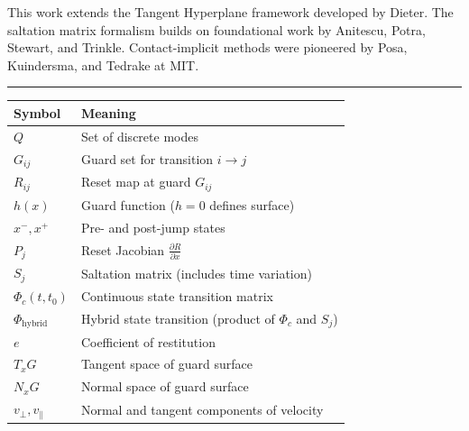 \documentclass[
  letterpaper,
  DIV=11,
  numbers=noendperiod]{scrartcl}
\begin{document}
This work extends the Tangent Hyperplane framework developed by Dieter.
The saltation matrix formalism builds on foundational work by Anitescu,
Potra, Stewart, and Trinkle. Contact-implicit methods were pioneered by
Posa, Kuindersma, and Tedrake at MIT.

\begin{center}\rule{0.5\linewidth}{0.5pt}\end{center}

\begin{tcolorbox}[enhanced jigsaw, coltitle=black, titlerule=0mm, toprule=.15mm, opacitybacktitle=0.6, left=2mm, opacityback=0, rightrule=.15mm, leftrule=.75mm, breakable, colframe=quarto-callout-note-color-frame, bottomtitle=1mm, toptitle=1mm, arc=.35mm, title=\textcolor{quarto-callout-note-color}{\faInfo}\hspace{0.5em}{Notation Summary}, bottomrule=.15mm, colback=white, colbacktitle=quarto-callout-note-color!10!white]

\begin{longtable}[]{@{}
  >{\raggedright\arraybackslash}p{}
  >{\raggedright\arraybackslash}p{}@{}}
\toprule\noalign{}
\begin{minipage}[b]{\linewidth}\raggedright
Symbol
\end{minipage} & \begin{minipage}[b]{\linewidth}\raggedright
Meaning
\end{minipage} \\
\midrule\noalign{}
\endhead
\bottomrule\noalign{}
\endlastfoot
\(Q\) & Set of discrete modes \\
\(G_{ij}\) & Guard set for transition \(i \to j\) \\
\(R_{ij}\) & Reset map at guard \(G_{ij}\) \\
\(h(x)\) & Guard function (\(h = 0\) defines surface) \\
\(x^-, x^+\) & Pre- and post-jump states \\
\(P_j\) & Reset Jacobian \(\frac{\partial R}{\partial x}\) \\
\(S_j\) & Saltation matrix (includes time variation) \\
\(\Phi_c(t, t_0)\) & Continuous state transition matrix \\
\(\Phi_{\text{hybrid}}\) & Hybrid state transition (product of
\(\Phi_c\) and \(S_j\)) \\
\(e\) & Coefficient of restitution \\
\(T_x G\) & Tangent space of guard surface \\
\(N_x G\) & Normal space of guard surface \\
\(v_\perp, v_\parallel\) & Normal and tangent components of velocity \\
\end{longtable}

\end{tcolorbox}
\end{document}
